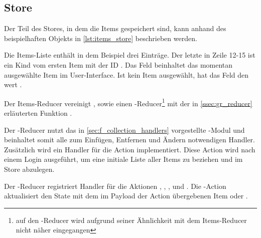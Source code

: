\subsection{Store}
\label{ssec:fi_store}

Der Teil des Stores, in dem die Items gespeichert sind, kann anhand des
beispielhaften Objekts in \cref{lst:items_store} beschrieben werden.



Die Items-Liste enthält in dem Beispiel drei Einträge.  Der letzte in Zeile
12-15 ist ein Kind vom ersten Item mit der ID .  Das Feld
 beinhaltet das momentan ausgewählte Item im User-Interface.
Ist kein Item ausgewählt, hat das Feld den wert .

Der Items-Reducer vereinigt ,  sowie
einen -Reducer\footnote{auf den -Reducer
wird aufgrund seiner Ähnlichkeit mit dem Items-Reducer nicht näher
eingegangen} mit der in \cref{ssec:gr_reducer} erläuterten Funktion
.

Der -Reducer nutzt das in \cref{sec:f_collection_handlers}
vorgestellte -Modul und beinhaltet somit alle zum
Einfügen, Entfernen und Ändern notwendigen Handler.  Zusätzlich wird ein
Handler für die Action  implementiert.  Diese
Action wird nach einem Login ausgeführt, um eine initiale Liste aller Items
zu beziehen und im Store abzulegen.

Der -Reducer registriert Handler für die Aktionen
, ,
, und .  Die
-Action aktualisiert den State mit dem im Payload
der Action übergebenen Item oder .
